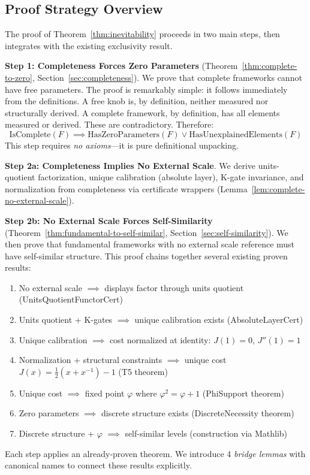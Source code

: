 \documentclass[12pt]{article}
\theoremstyle{remark}
\begin{document}
\subsection{Proof Strategy Overview}

The proof of Theorem~\ref{thm:inevitability} proceeds in two main steps, then integrates with the existing exclusivity result.

\textbf{Step 1: Completeness Forces Zero Parameters} (Theorem~\ref{thm:complete-to-zero}, Section~\ref{sec:completeness}).
We prove that complete frameworks cannot have free parameters. The proof is remarkably simple: it follows immediately from the definitions. A free knob is, by definition, neither measured nor structurally derived. A complete framework, by definition, has all elements measured or derived. These are contradictory. Therefore:
\[
\mathrm{IsComplete}(F) \implies \mathrm{HasZeroParameters}(F) \lor \mathrm{HasUnexplainedElements}(F)
\]
This step requires \emph{no axioms}---it is pure definitional unpacking.

\textbf{Step 2a: Completeness Implies No External Scale}. We derive units-quotient factorization, unique calibration (absolute layer), K-gate invariance, and normalization from completeness via certificate wrappers (Lemma~\ref{lem:complete-no-external-scale}).

\textbf{Step 2b: No External Scale Forces Self-Similarity} (Theorem~\ref{thm:fundamental-to-self-similar}, Section~\ref{sec:self-similarity}).
We then prove that fundamental frameworks with no external scale reference must have self-similar structure. This proof chains together several existing proven results:
\begin{enumerate}
\item No external scale $\implies$ displays factor through units quotient (UnitsQuotientFunctorCert)
\item Units quotient + K-gates $\implies$ unique calibration exists (AbsoluteLayerCert)
\item Unique calibration $\implies$ cost normalized at identity: $J(1)=0$, $J''(1)=1$
\item Normalization + structural constraints $\implies$ unique cost $J(x) = \frac{1}{2}(x+x^{-1})-1$ (T5 theorem)
\item Unique cost $\implies$ fixed point $\varphi$ where $\varphi^2 = \varphi + 1$ (PhiSupport theorem)
\item Zero parameters $\implies$ discrete structure exists (DiscreteNecessity theorem)
\item Discrete structure + $\varphi$ $\implies$ self-similar levels (construction via Mathlib)
\end{enumerate}
Each step applies an already-proven theorem. We introduce 4 \emph{bridge lemmas} with canonical names to connect these results explicitly.
\end{document}
